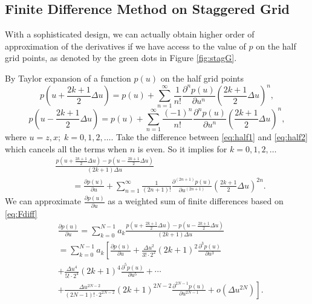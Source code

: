 \documentclass[11pt]{article}
\theoremstyle{plain}
\theoremstyle{definition}
\theoremstyle{remark}
\numberwithin{equation}{section}
\begin{document}
\subsection{Finite Difference Method on Staggered Grid}
With a sophisticated design, we can actually obtain higher order of approximation of the derivatives if we have access to the value of $p$ on the half grid points, as denoted by the green dots in Figure \ref{fig:stagG}. 

By Taylor expansion of a function $p(u)$ on the half grid points
  \begin{equation}\label{eq:half1}
      p\left(u + \frac{2k+1}{2}\Delta u\right) = p(u) + \sum\limits_{n=1}^{\infty} \frac{1}{n!}\frac{\partial^n p(u)}{\partial u^n}\left(\frac{2k+1}{2}\Delta u\right)^n, 
      \end{equation}
      \begin{equation}\label{eq:half2}
      p\left(u - \frac{2k+1}{2}\Delta u\right) = p(u) + \sum\limits_{n=1}^{\infty} \frac{(-1)^n}{n!}\frac{\partial^n p(u)}{\partial u^n}\left(\frac{2k+1}{2}\Delta u\right)^n,
  \end{equation}
where $u = z, x; \; k = 0, 1, 2, \dots $.
  Take the difference between \eqref{eq:half1} and \eqref{eq:half2} which cancels all the terms when $n$ is even.
So it implies for $k = 0, 1, 2, \dots$
\begin{equation}
\label{eq:Fdiff}
    \begin{aligned}
   &  \frac{p\left(u + \frac{2k+1}{2}\Delta u\right) - p\left(u - \frac{2k+1}{2}\Delta u\right)}{(2k+1)\Delta u}\\
    &~~~~~~~~~  =  \frac{\partial p(u)}{\partial u} + \sum\limits_{n=1 }^{\infty} \frac{1}{(2n+1)!}\frac{\partial^{(2n+1)} p(u)}{\partial u^{(2n+1)}}\left(\frac{2k+1}{2}\Delta u\right)^{2n}.
    \end{aligned}
    \end{equation}
We can approximate $\frac{\partial p(u)}{\partial u}$ as a weighted sum of finite differences based on \eqref{eq:Fdiff}
  \begin{equation}
  \label{eq:weight}
  \begin{aligned}
    &\frac{\partial p(u)}{\partial u} = \sum\limits_{k=0}^{N-1} a_k \frac{p\left(u + \frac{2k+1}{2}\Delta u\right) - p\left(u - \frac{2k+1}{2}\Delta u\right)}{(2k+1)\Delta u} \\
    &= \sum\limits_{k=0}^{N-1} a_k \left[ \frac{\partial p(u)}{\partial u} + \frac{\Delta u^2}{3! \cdot 2^2}(2k+1)^2\frac{\partial^3 p(u)}{\partial u^3} \right.\\&\left. + \frac{\Delta u^4}{5! \cdot 2^4}(2k+1)^4\frac{\partial^5 p(u)}{\partial u^5} + \cdots \right.\\&\left. + \frac{\Delta u^{2N-2}}{(2N-1)! \cdot 2^{2N-2}}(2k+1)^{2N-2}\frac{\partial^{2N-1} p(u)}{\partial u^{2N-1}} + o(\Delta u^{2N}) \right].
  \end{aligned}
  \end{equation}
\end{document}
